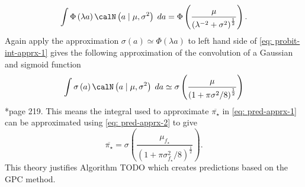 \begin{equation} \label{eq: probit-int-apprx-1}
    \int \Phi \left( \lambda a \right) \calN \left( a \mid \mu , \sigma^2 \right) \; da = \Phi \left( \frac{\mu}{\left( \lambda^{-2} + \sigma^2 \right)^{\frac{1}{2}}} \right).
\end{equation}
Again apply the approximation $\sigma \left( a \right) \simeq \Phi \left( \lambda a \right)$ to left hand side of \ref{eq: probit-int-apprx-1} gives the following approximation of the convolution of a Gaussian and sigmoid function
\begin{equation} \label{eq: pred-apprx-2}
    \int \sigma \left( a \right) \calN \left( a \mid \mu , \sigma^2 \right) \; da \simeq \sigma \left( \frac{\mu}{\left( 1 + \pi \sigma^2 / 8 \right)^{\frac{1}{2}}} \right)
\end{equation}
\cite{BishopChristopherM2006Pram}*{page 219}. This means the integral used to approximate $\overline{\pi_{\star}}$ in \ref{eq: pred-apprx-1} can be approximated using \ref{eq: pred-apprx-2} to give
\begin{equation*} \label{eq: pred-apprx-3}
    \overline{\pi_{\star}} = \sigma \left( \frac{\mu_{f_{\star}}}{\left( 1 + \pi \sigma_{f_{\star}}^2 / 8 \right)^{\frac{1}{2}}} \right).
\end{equation*}
This theory justifies Algorithm TODO which creates predictions based on the GPC method.

